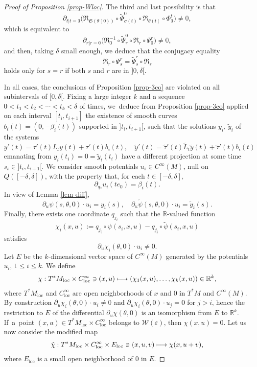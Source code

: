 \documentclass[10pt]{amsart}
\newcommand\mto{\mathchoice{\longmapsto}{\mapsto}{\mapsto}{\mapsto}}
\newcommand{\loc}{\mathrm{loc}}
\let\epsilon\varepsilon
\newcommand{\Rm}{\mathbb{R}}
\newcommand{\gR}{\ensuremath{\mathfrak{R}}}
\newcommand{\gS}{\ensuremath{\mathfrak{S}}}
\newcommand{\mW}{\ensuremath{\mathcal{W}}}
\theoremstyle{plain}
\theoremstyle{definition}
\begin{document}
\begin{proof}[Proof of Proposition \ref{prop-Wloc}]
The third and last possibility is that
\[
\partial_{t|t=0} \big(\gR_{\gS(\theta(0))}\circ\tilde \Phi_{\sigma(t)}^0\circ\gR_{\theta(t)}\circ \Phi_0^t\big) \neq 0,
\]
which is equivalent to
\[
\partial_{r|r=0} \big(\gR_0^{-1}\circ \tilde \Psi_r^0\circ\gR_{r}\circ \Psi_0^r\big) \neq 0,
\]
and then, taking $\delta$ small enough, we deduce that the
conjugacy equality
\[
\gR_{r}\circ \Psi_s^r= \tilde \Psi_s^r\circ \gR_{s}
\]
holds only for $s= r$ if both $s$ and $r$ are in $]0, \delta[$.

In all cases, the conclusions of Proposition \ref{prop-3co} are violated on all subintervals of $[0, \delta[$.
Fixing a large integer $k$ and a sequence $0<t_1< t_2 < \cdots <t_k<\delta$ of times, we~deduce from
Proposition \ref{prop-3co} applied on each interval $[t_i, t_{i+1}]$ the existence of smooth curves
$b_i(t)=(0, -\beta_i(t))$ supported in
$]t_i, t_{i+1}[$, such that the solutions $y_i$, $\tilde y_i$ of the systems
\[
y'(t)=\tau'(t)L_ty(t)+\tau'(t)b_i(t), \quad
\tilde y'(t)=\tilde \tau '(t)\tilde L_t\tilde y(t)+\tilde \tau'(t) b_i(t)
\]
emanating from $y_i(t_i)\!=\!0\!=\!\tilde y_i(t_i)$ have a different projection at some time $s_i\!\in\!{}]t_i, t_{i+1}[$.
We consider smooth potentials $u_i\in C^{\infty}(M)$, null on $Q([-\delta, \delta])$, with the property that,
for each $t\in [-\delta, \delta]$,
\[
\partial_{q_*} u_i(te_0)=\beta_i(t).
\]
In view of Lemma \ref{lem-diff},
\[
\partial_u \psi (s,\theta,0)\cdot u_i = y_i(s),\quad
\partial_u \tilde \psi (s,\theta,0)\cdot u_i = \tilde y_i(s).
\]
Finally, there exists one coordinate $q_{j_i}$ such that the $\Rm$-valued function
\[
\chi_i(x,u):=q_{j_i}\circ\psi(s_i,x,u)-q_{j_i}\circ \tilde \psi(s_i,x,u)
\]
satisfies
\[
\partial_u \chi_i(\theta,0)\cdot u_i \neq 0.
\]
Let $E$ be the $k$-dimensional vector space of $C^{\infty}(M)$ generated by the potentials $u_i$, $1\leq i \leq k$. We define
\[
\chi: T^*M_{\loc}\times C^{\infty}_{\loc}\ni(x,u)\mto (\chi_1(x,u), \ldots, \chi_k(x,u))\in \Rm^k,
\]
where $T^*M_{\loc}$ and $ C^{\infty}_{\loc}$ are open neighborhoods of $x$ and $0$ in $T^*M$ and $C^{\infty}(M)$.
By construction
$
\partial_u \chi_i(\theta,0)\cdot u_i \neq 0$
and
$
\partial_u \chi_i(\theta,0)\cdot u_j = 0$ for $j >i$, hence
the restriction to $E$ of the differential $\partial_u\chi (\theta,0)$ is an isomorphism from $E$ to $\Rm^k$.
If~a~point $(x,u)\in T^*M_{\loc}\times C^{\infty}_{\loc}$ belongs to $\mW(\epsilon)$, then $\chi(x,u)=0$.
Let us now consider the modified map
\[
\hat \chi:T^*M_{\loc}\times C^{\infty}_{\loc}\times E_{\loc} \ni (x,u,v)\mto \chi(x,u+v),
\]
where $E_{\loc}$ is a small open neighborhood of $0$ in $E$.

\end{proof}
\end{document}
